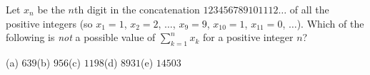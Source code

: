 Let $x_n$ be the $n$th digit in the concatenation $123456789101112\ldots$ of all the positive integers (so $x_1=1$, $x_2=2$, $\dots$, $x_9=9$, $x_{10}=1$, $x_{11}=0$, $\dots$). Which of the following is \emph{not} a possible value of $\displaystyle\sum_{k=1}^{n}x_k$ for a positive integer $n$?

(a) $639$\quad (b) $956$\quad (c) $1198$\quad (d) $8931$\quad (e) $14503$
